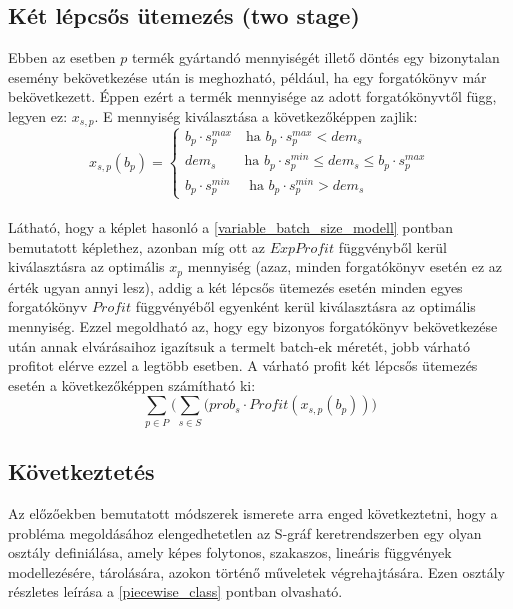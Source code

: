 \subsection{Két lépcsős ütemezés (two stage)} \label{TwoStage}
Ebben az esetben $p$ termék gyártandó mennyiségét illető döntés egy bizonytalan esemény bekövetkezése után is meghozható, például, ha egy forgatókönyv már bekövetkezett. Éppen ezért a termék mennyisége az adott forgatókönyvtől függ, legyen ez: $x_{s,p}$. E mennyiség kiválasztása a következőképpen zajlik:
\begin{equation*}
x_{s,p}(b_p)= \begin{cases}
            b_p \cdot s_p^{max} \quad \text{ha } b_p \cdot s_p^{max}<dem_{s}\\
            dem_{s} \qquad \text{ha } b_p \cdot s_p^{min} \leq dem_{s} \leq b_p \cdot s_p^{max}\\
            b_p \cdot s_p^{min} \quad \text{ ha } b_p \cdot s_p^{min}>dem_{s}
       \end{cases}       
\end{equation*}\\
Látható, hogy a képlet hasonló a \ref{variable_batch_size_modell} pontban bemutatott képlethez, azonban míg ott  az $ExpProfit$ függvényből kerül kiválasztásra az optimális $x_p$ mennyiség (azaz, minden forgatókönyv esetén ez az érték ugyan annyi lesz), addig a két lépcsős ütemezés esetén minden egyes forgatókönyv $Profit$ függvényéből egyenként kerül kiválasztásra az optimális mennyiség. Ezzel megoldható az, hogy egy bizonyos forgatókönyv bekövetkezése után annak elvárásaihoz igazítsuk a termelt batch-ek méretét, jobb várható profitot elérve ezzel a legtöbb esetben. A várható profit két lépcsős ütemezés esetén a következőképpen számítható ki:
$$\sum_{p \in P} \bigg( \sum_{s \in S}(prob_s \cdot Profit(x_{s,p}(b_p)) \bigg)$$ 
\subsection{Következtetés} \label{piecewise_suggestion}
Az előzőekben bemutatott módszerek ismerete arra enged következtetni, hogy a probléma megoldásához elengedhetetlen az S-gráf keretrendszerben egy olyan osztály definiálása, amely képes  folytonos, szakaszos, lineáris függvények modellezésére, tárolására, azokon történő műveletek végrehajtására. Ezen osztály részletes leírása a \ref{piecewise_class} pontban olvasható.
